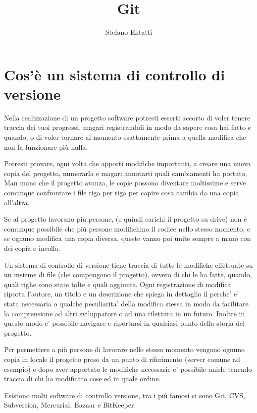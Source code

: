 \documentclass{article} \usepackage[textwidth=18cm,textheight=18cm]{geometry}
\title{Git} \date{\vspace{-5ex}} \author{Stefano Entatti}
\begin{document}
\maketitle

\newcommand{\code}[1]{\texttt{#1}}

\section{Cos'è un sistema di controllo di versione}

Nella realizzazione di un progetto software potresti esserti accorto di voler
tenere traccia dei tuoi progressi, magari registrandoli in modo da sapere cosa
hai fatto e quando, o di voler tornare al momento esattamente prima a quella
modifica che non fa funzionare più nulla. 

Potresti provare, ogni volta che apporti modifiche importanti, a creare una
nuova copia del progetto, numerarla e magari annotarti quali cambiamenti ha
portato. Man mano che il progetto avanza, le copie possono diventare moltissime
e serve comunque confrontare i file riga per riga per capire cosa cambia da una
copia all'altra.

Se al progetto lavorano più persone, (e quindi carichi il progetto su drive) non
è comunque possibile che più persone modifichino il codice nello stesso momento,
e se ognuno modifica una copia diversa, queste vanno poi unite sempre a mano con
dei copia e incolla.

Un sistema di controllo di versione tiene traccia di tutte le modifiche
effettuate su un insieme di file (che compongono il progetto), ovvero di chi le
ha fatte, quando, quali righe sono state tolte e quali aggiunte. Ogni registrazione
di modifica riporta l'autore, un titolo e un descrizione che spiega in dettaglio
il perche' e' stata necessaria o qualche peculiarita' della modifica stessa
in modo da facilitare la comprensione ad altri sviluppatore o ad una rilettura
in un futuro. Inoltre in questo modo e' possibile navigare e riportarsi in 
qualsiasi punto della storia del progetto.

Per permettere a più persone di lavorare nello stesso momento vengono ognuno
copia in locale il progetto preso da un punto di riferimento (server comune ad esempio)
e dopo aver apportato le modifiche necessarie e' possibile unirle tenendo traccia
di chi ha modificato cose ed in quale ordine.

Esistono molti software di controllo versione, tra i più famosi ci sono Git,
CVS, Subversion, Mercurial, Bazaar e BitKeeper.
\end{document}
